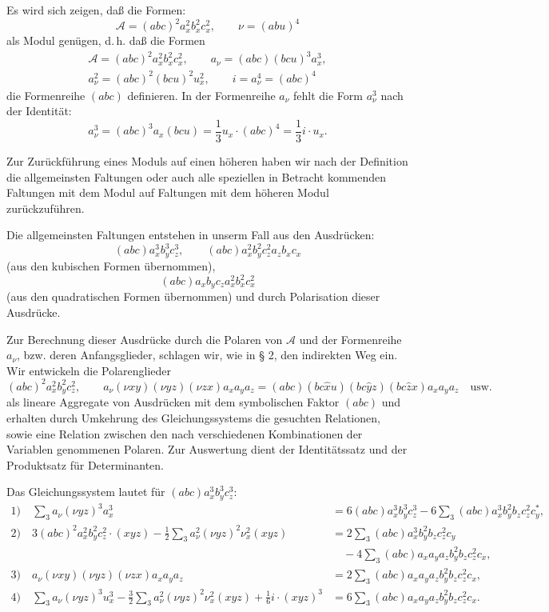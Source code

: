 \documentclass[11pt]{article}
\newcommand{\A}{\mathcal A}
\begin{document}
Es wird sich zeigen, daß die Formen:
\[
\A=(abc)^2a_x^2b_x^2c_x^2,\qquad \nu=(abu)^4
\]
als Modul genügen, d.\,h. daß die Formen
\[
\begin{gathered}
\A=(abc)^2a_x^2b_x^2c_x^2,\qquad
a_\nu=(abc)(bcu)^3a_x^3,\\
a_\nu^2=(abc)^2(bcu)^2u_x^2,\qquad
i=a_\nu^4=(abc)^4
\end{gathered}
\]
die Formenreihe $(abc)$ definieren. In der Formenreihe $a_\nu$ fehlt die Form $a_\nu^3$ nach der Identität:
\[
a_\nu^3=(abc)^3a_x(bcu)=\frac13 u_x\cdot(abc)^4=\frac13 i\cdot u_x.
\]

Zur Zurückführung eines Moduls auf einen höheren haben wir nach der Definition die allgemeinsten Faltungen oder auch alle speziellen in Betracht kommenden Faltungen mit dem Modul auf Faltungen mit dem höheren Modul zurückzuführen.

Die allgemeinsten Faltungen entstehen in unserm Fall aus den Ausdrücken:
\[
(abc)a_x^3b_y^3c_z^3,\qquad
(abc)a_x^2b_y^2c_z^2a_zb_xc_x
\]
(aus den kubischen Formen übernommen),
\[
(abc)a_xb_yc_za_x^2b_x^2c_x^2
\]
(aus den quadratischen Formen übernommen) und durch Polarisation dieser Ausdrücke.

Zur Berechnung dieser Ausdrücke durch die Polaren von $\A$ und der Formenreihe $a_\nu$, bzw. deren Anfangsglieder, schlagen wir, wie in § 2, den indirekten Weg ein. Wir entwickeln die Polarenglieder
\[
(abc)^2a_x^2b_y^2c_z^2,\qquad
a_\nu(\nu xy)(\nu yz)(\nu zx)a_xa_ya_z
=(abc)(bc\widehat{x}u)(bc\widehat{y}z)(bc\widehat{z}x)a_xa_ya_z\quad\text{usw.}
\]
als lineare Aggregate von Ausdrücken mit dem symbolischen Faktor $(abc)$ und erhalten durch Umkehrung des Gleichungssystems die gesuchten Relationen, sowie eine Relation zwischen den nach verschiedenen Kombinationen der Variablen genommenen Polaren. Zur Auswertung dient der Identitätssatz und der Produktsatz für Determinanten.

Das Gleichungssystem lautet für $(abc)a_x^3b_y^3c_z^3$:
\begingroup\small
\[
\begin{aligned}
1)\quad
\sum_3 a_\nu(\nu yz)^3a_x^3
&=6(abc)a_x^3b_y^3c_z^3
-6\sum_3(abc)a_x^3b_y^2b_zc_z^2c_y^{*},\\[0.4em]
2)\quad
3(abc)^2a_x^2b_y^2c_z^2\cdot(xyz)
-\frac12\sum_3 a_\nu^2(\nu yz)^2\nu_x^2(xyz)
&=2\sum_3(abc)a_x^3b_y^2b_zc_z^2c_y\\
&\quad-4\sum_3(abc)a_xa_ya_zb_y^2b_zc_z^2c_x,\\[0.4em]
3)\quad
a_\nu(\nu xy)(\nu yz)(\nu zx)a_xa_ya_z
&=2\sum_3(abc)a_xa_ya_zb_y^2b_zc_z^2c_x,\\[0.4em]
4)\quad
\sum_3 a_\nu(\nu yz)^3u_x^3
-\frac32\sum_3 a_\nu^2(\nu yz)^2\nu_x^2(xyz)
+\frac16 i\cdot(xyz)^3
&=6\sum_3(abc)a_xa_ya_zb_y^2b_zc_z^2c_x.
\end{aligned}
\]
\endgroup
\end{document}
